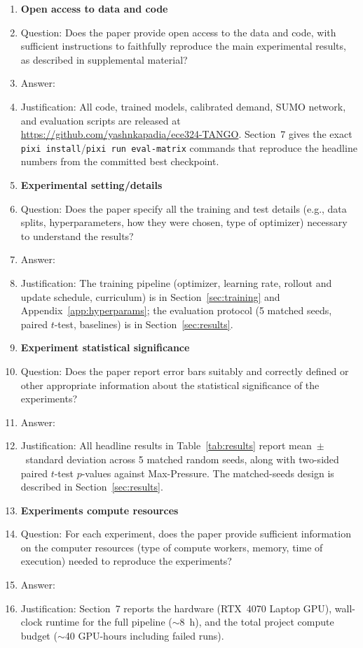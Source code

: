 \documentclass{article}
\begin{document}
\begin{enumerate}
\item {\bf Open access to data and code}
    \item[] Question: Does the paper provide open access to the data and code, with sufficient instructions to faithfully reproduce the main experimental results, as described in supplemental material?
    \item[] Answer: \answerYes{}
    \item[] Justification: All code, trained models, calibrated demand, SUMO network, and evaluation scripts are released at \url{https://github.com/yashnkapadia/ece324-TANGO}. Section~7 gives the exact \texttt{pixi install}/\texttt{pixi run eval-matrix} commands that reproduce the headline numbers from the committed best checkpoint.

\item {\bf Experimental setting/details}
    \item[] Question: Does the paper specify all the training and test details (e.g., data splits, hyperparameters, how they were chosen, type of optimizer) necessary to understand the results?
    \item[] Answer: \answerYes{}
    \item[] Justification: The training pipeline (optimizer, learning rate, rollout and update schedule, curriculum) is in Section~\ref{sec:training} and Appendix~\ref{app:hyperparams}; the evaluation protocol (5 matched seeds, paired $t$-test, baselines) is in Section~\ref{sec:results}.

\item {\bf Experiment statistical significance}
    \item[] Question: Does the paper report error bars suitably and correctly defined or other appropriate information about the statistical significance of the experiments?
    \item[] Answer: \answerYes{}
    \item[] Justification: All headline results in Table~\ref{tab:results} report mean~$\pm$~standard deviation across 5 matched random seeds, along with two-sided paired $t$-test $p$-values against Max-Pressure. The matched-seeds design is described in Section~\ref{sec:results}.

\item {\bf Experiments compute resources}
    \item[] Question: For each experiment, does the paper provide sufficient information on the computer resources (type of compute workers, memory, time of execution) needed to reproduce the experiments?
    \item[] Answer: \answerYes{}
    \item[] Justification: Section~7 reports the hardware (RTX~4070 Laptop GPU), wall-clock runtime for the full pipeline ($\sim$8~h), and the total project compute budget ($\sim$40 GPU-hours including failed runs).


\end{enumerate}
\end{document}

